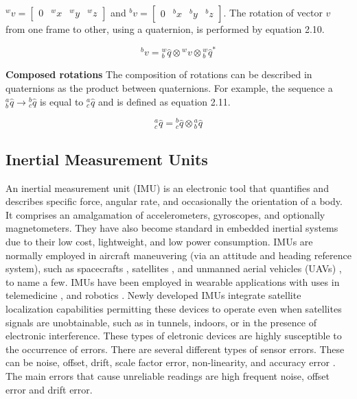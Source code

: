 $ ^wv = \begin{bmatrix}
        0 & ^wx & ^wy & ^wz
    \end{bmatrix} $
and
$^bv = \begin{bmatrix}
        0 & ^bx & ^by & ^bz
    \end{bmatrix} $. The rotation of vector $v$ from one frame to other, using a quaternion, is performed by equation 2.10.

\begin{equation}
    \textrm{$^{b}v$} = \textrm{$_{b}^{w}\hat{q}$} \otimes \textrm{$^{w}v$} \otimes \textrm{$_{b}^{w}\hat{q}$}^*
\end{equation}

\item \textbf{Composed rotations} The composition of rotations can be described in quaternions as the product between quaternions. For example, the sequence a $^a_b\hat{q} \rightarrow {^b_c\hat{q}}$ is equal to $^a_c{\hat{q}}$ and is defined as equation 2.11.


\begin{equation}
    \textrm{$_{c}^{a}\hat{q}$} = \textrm{$_{c}^{b}\hat{q}$} \otimes \textrm{$_{b}^{a}\hat{q}$}
\end{equation}

\subsection{Inertial Measurement Units}

An inertial measurement unit (IMU) is an electronic tool that quantifies and describes specific force, angular rate, and occasionally the orientation of a body. It comprises an amalgamation of accelerometers, gyroscopes, and optionally magnetometers. They have also become standard in embedded inertial systems due to their low cost, lightweight, and low power consumption. IMUs are normally employed in aircraft maneuvering (via an attitude and heading reference system), such as spacecrafts \cite{li2011calibration} \cite{haberberger2016imu} \cite{faragher2012understanding}, satellites \cite{lu2020orbit}, and unmanned aerial vehicles (UAVs) \cite{sahawneh2008development} \cite{eling2015real}, to name a few. IMUs have been employed in wearable applications with uses in  telemedicine \cite{madgwick2020extended} \cite{allen2013telemedicine} \cite{giansanti2009toward} \cite{o2021measuring}, and robotics \cite{wilson2019formulation}. Newly developed IMUs integrate satellite localization capabilities permitting these devices to operate even when satellites signals are unobtainable, such as in tunnels, indoors, or in the presence of electronic interference. These types of eletronic devices are highly susceptible to the occurrence of errors. There are several different types of sensor errors. These can be noise, offset, drift, scale factor error, non-linearity, and accuracy error \cite{hanke2016classification}. The main errors that cause unreliable readings are high frequent noise, offset error and drift error.

